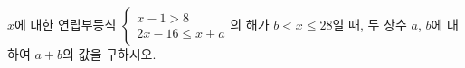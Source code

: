 $x$에 대한 연립부등식 $\begin{cases} x-1>8 \\ 2x-16\le x+a \end{cases}$의 해가 $b<x\le 28$일 때, 두 상수 $a$, $b$에 대하여 $a+b$의 값을 구하시오.
